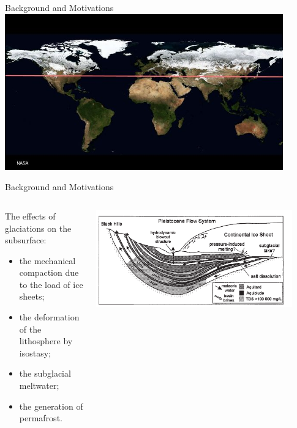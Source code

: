 \documentclass{beamer}
\begin{document}
\begin{frame}{Background and Motivations}
\centering
\includegraphics[width=0.9\textwidth]{figure/ice_age_snows}
\end{frame}
\begin{frame}{Background and Motivations}
\begin{columns}
\begin{column}{0.65\textwidth}
\begin{block}{The effects of glaciations on the subsurface:} 
\begin {itemize}
\item  the mechanical compaction due to the load of ice sheets; 
\item  the deformation of the lithosphere by isostasy; 
\item  the subglacial meltwater; 
\item  the generation of permafrost. 
\end{itemize}
\end{block}
\end{column}
\begin{column}{0.35\textwidth}
\includegraphics[width=0.9\textwidth]{figure/basin_glacial}
\end{column}
\end{columns}
\end{frame}
\end{document}
